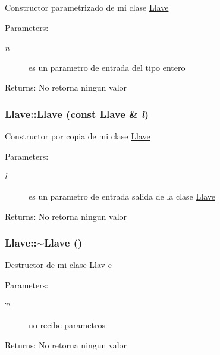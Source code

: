 Constructor parametrizado de mi clase \hyperlink{classLlave}{Llave} \begin{Desc}
\item[Parameters:]
\begin{description}
\item[{\em n}]es un parametro de entrada del tipo entero \end{description}
\end{Desc}
\begin{Desc}
\item[Returns:]No retorna ningun valor \end{Desc}
\hypertarget{classLlave_7db4b83fa86cc3974ac90c6c34c9c56e}{
\subsubsection[Llave]{\setlength{\rightskip}{0pt plus 5cm}Llave::Llave (const {\bf Llave} \& {\em l})}}
\label{classLlave_7db4b83fa86cc3974ac90c6c34c9c56e}


Constructor por copia de mi clase \hyperlink{classLlave}{Llave} \begin{Desc}
\item[Parameters:]
\begin{description}
\item[{\em l}]es un parametro de entrada salida de la clase \hyperlink{classLlave}{Llave} \end{description}
\end{Desc}
\begin{Desc}
\item[Returns:]No retorna ningun valor \end{Desc}
\hypertarget{classLlave_b0e13e4c7afa757571506ac3d04e5df2}{
\subsubsection[$\sim$Llave]{\setlength{\rightskip}{0pt plus 5cm}Llave::$\sim$Llave ()}}
\label{classLlave_b0e13e4c7afa757571506ac3d04e5df2}


Destructor de mi clase Llav e \begin{Desc}
\item[Parameters:]
\begin{description}
\item[{\em \char`\"{}\char`\"{}}]no recibe parametros \end{description}
\end{Desc}
\begin{Desc}
\item[Returns:]No retorna ningun valor \end{Desc}


